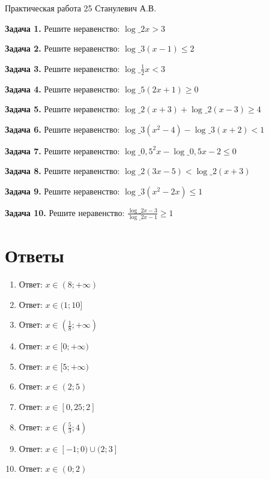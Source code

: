 \documentclass{umk-matematika}
\begin{document}
\maketitlepage
    {Практическая работа 25}
    {}
    {Станулевич А.В.}

\textbf{Задача 1.} Решите неравенство: $\log\_{2} x > 3$\par\vspace{10pt}
\textbf{Задача 2.} Решите неравенство: $\log\_{3} (x - 1) \le 2$\par\vspace{10pt}
\textbf{Задача 3.} Решите неравенство: $\log\_{\frac{1}{2}} x < 3$\par\vspace{10pt}
\textbf{Задача 4.} Решите неравенство: $\log\_{5} (2x + 1) \ge 0$\par\vspace{10pt}
\textbf{Задача 5.} Решите неравенство: $\log\_{2} (x + 3) + \log\_{2} (x - 3) \ge 4$\par\vspace{10pt}
\textbf{Задача 6.} Решите неравенство: $\log\_{3} (x^2 - 4) - \log\_{3} (x + 2) < 1$\par\vspace{10pt}
\textbf{Задача 7.} Решите неравенство: $\log\_{0{,}5}^{2} x - \log\_{0{,}5} x - 2 \le 0$\par\vspace{10pt}
\textbf{Задача 8.} Решите неравенство: $\log\_{2} (3x - 5) < \log\_{2} (x + 3)$\par\vspace{10pt}
\textbf{Задача 9.} Решите неравенство: $\log\_{3} (x^2 - 2x) \le 1$\par\vspace{10pt}
\textbf{Задача 10.} Решите неравенство: $\frac{\log\_{2} x - 3}{\log\_{2} x - 1} \ge 1$\par\vspace{10pt}
\newpage
\section*{Ответы}

\begin{enumerate}
  \item Ответ: $x \in (8; +\infty)$
  \item Ответ: $x \in (1; 10]$
  \item Ответ: $x \in \left(\frac{1}{8}; +\infty\right)$
  \item Ответ: $x \in [0; +\infty)$
  \item Ответ: $x \in [5; +\infty)$
  \item Ответ: $x \in (2; 5)$
  \item Ответ: $x \in [0{,}25; 2]$
  \item Ответ: $x \in \left(\frac{5}{3}; 4\right)$
  \item Ответ: $x \in [-1; 0) \cup (2; 3]$
  \item Ответ: $x \in (0; 2)$
\end{enumerate}
\end{document}
